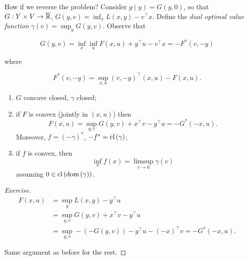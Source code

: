 How if we reverse the problem? Consider $g(y) = G(y,0)$, so that $G : Y \times V \to \overline{\mathbb{R}}$, $G(y,v) = \inf_x L(x,y) - v^\top x$. Define the \emph{dual optimal value function} $\gamma(v) = \sup_y G(y,v)$. Observe that 

\[ G(y,v) = \inf_x \inf_u F(x,u) + y^\top u - v^\top x = -F^*(v,-y) \]

where 

\[ F^*(v,-y) = \sup_{x,u} (v,-y)^\top (x,u) - F(x,u). \]

\begin{theorem}
    
    \begin{enumerate}
        \item $G$ concave closed, $\gamma$ closed;
        \item if $F$ is convex (jointly in $(x,u)$) then 
            \[ F(x,u) = \sup_{y,v} G(y,v) + x^\top v - y^\top u = -G^*(-x,u). \]
        Moreover, $f = (-\gamma)^*$, $-f^* = \mathrm{cl}\left(\gamma\right)$;
        \item if $f$ is convex, then 
            \[ \inf_x f(x) = \limsup_{v \to 0} \gamma(v) \]
            assuming $0 \in \mathrm{cl}\left(\mathrm{dom}\left(\gamma\right)\right)$.
    \end{enumerate}

\end{theorem}

\begin{proof}[Exercise]

    \begin{align*}
        F(x,u) &= \sup_y L(x,y) - y^\top u \\
            &= \sup_{y,v} G(y,v) + x^\top v - y^\top u \\
            &= \sup_{y,v} -(-G(y,v)) - y^\top u - (-x)^\top v = -G^*(-x,u).
    \end{align*}

    Same argument as before for the rest.
    
\end{proof}

